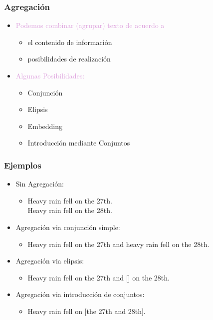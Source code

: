 \documentclass[compress,color=usenames]{beamer}
\newcommand{\mH}[1]{\textcolor{Plum}{#1}}
\begin{document}
\begin{frame}
\frametitle{Agregaci\'on}

\begin{itemize}
\item { \mH{Podemos combinar (agrupar) texto de acuerdo a}}
\begin{itemize}
\item { {el contenido de informaci\'on}}
\item { {posibilidades de realizaci\'on}}
\end{itemize}
\item { \mH{Algunas Posibilidades:}}
\begin{itemize}
\item { {Conjunci\'on}}
\item { {Elipsis}}
\item { {Embedding}}
\item { {Introducci\'on mediante Conjuntos}}
\end{itemize}
\end{itemize}
 
\end{frame}


\begin{frame}
\frametitle{Ejemplos}

\begin{itemize}
  \item { {Sin Agregaci\'on:}}
  \begin{itemize}
    \item Heavy rain fell on the 27th.\\
          Heavy rain fell on the 28th.
  \end{itemize}
\item { {Agregaci\'on via conjunci\'on simple:}}
\begin{itemize}
\item Heavy rain fell on the 27th and heavy rain fell on the 28th.
\end{itemize}
\item { {Agregaci\'on via elipsis: }}
\begin{itemize}
\item Heavy rain fell on the 27th and [] on the 28th.
\end{itemize}
\item { {Agregaci\'on via introducci\'on de conjuntos: }}
\begin{itemize}
\item Heavy rain fell on [the 27th and 28th].
\end{itemize}
\end{itemize}
 \end{frame}
\end{document}
